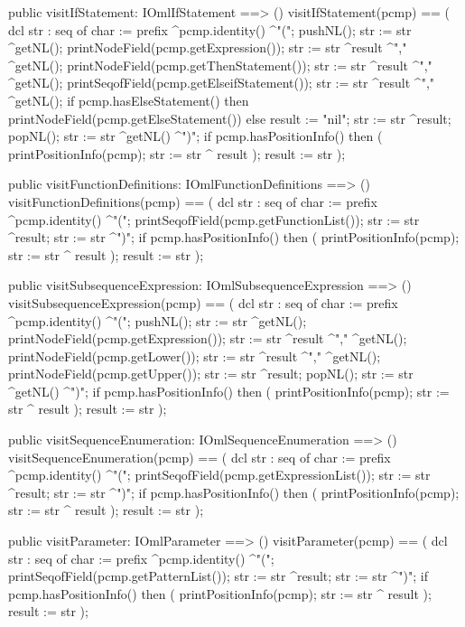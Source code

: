 \begin{vdm_al}
  public visitIfStatement: IOmlIfStatement ==> ()
  visitIfStatement(pcmp) ==
    ( dcl str : seq of char := prefix ^pcmp.identity() ^"(";
      pushNL();
      str := str ^getNL();
      printNodeField(pcmp.getExpression());
      str := str ^result ^"," ^getNL();
      printNodeField(pcmp.getThenStatement());
      str := str ^result ^"," ^getNL();
      printSeqofField(pcmp.getElseifStatement());
      str := str ^result ^"," ^getNL();
      if pcmp.hasElseStatement()
      then printNodeField(pcmp.getElseStatement())
      else result := "nil";
      str := str ^result;
      popNL();
      str := str ^getNL() ^")";
      if pcmp.hasPositionInfo()
      then ( printPositionInfo(pcmp);
             str := str ^ result );
      result := str );

  public visitFunctionDefinitions: IOmlFunctionDefinitions ==> ()
  visitFunctionDefinitions(pcmp) ==
    ( dcl str : seq of char := prefix ^pcmp.identity() ^"(";
      printSeqofField(pcmp.getFunctionList());
      str := str ^result;
      str := str ^")";
      if pcmp.hasPositionInfo()
      then ( printPositionInfo(pcmp);
             str := str ^ result );
      result := str );

  public visitSubsequenceExpression: IOmlSubsequenceExpression ==> ()
  visitSubsequenceExpression(pcmp) ==
    ( dcl str : seq of char := prefix ^pcmp.identity() ^"(";
      pushNL();
      str := str ^getNL();
      printNodeField(pcmp.getExpression());
      str := str ^result ^"," ^getNL();
      printNodeField(pcmp.getLower());
      str := str ^result ^"," ^getNL();
      printNodeField(pcmp.getUpper());
      str := str ^result;
      popNL();
      str := str ^getNL() ^")";
      if pcmp.hasPositionInfo()
      then ( printPositionInfo(pcmp);
             str := str ^ result );
      result := str );

  public visitSequenceEnumeration: IOmlSequenceEnumeration ==> ()
  visitSequenceEnumeration(pcmp) ==
    ( dcl str : seq of char := prefix ^pcmp.identity() ^"(";
      printSeqofField(pcmp.getExpressionList());
      str := str ^result;
      str := str ^")";
      if pcmp.hasPositionInfo()
      then ( printPositionInfo(pcmp);
             str := str ^ result );
      result := str );

  public visitParameter: IOmlParameter ==> ()
  visitParameter(pcmp) ==
    ( dcl str : seq of char := prefix ^pcmp.identity() ^"(";
      printSeqofField(pcmp.getPatternList());
      str := str ^result;
      str := str ^")";
      if pcmp.hasPositionInfo()
      then ( printPositionInfo(pcmp);
             str := str ^ result );
      result := str );


\end{vdm_al}
